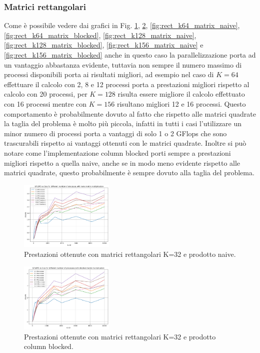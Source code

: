 \documentclass[conference]{IEEEtran}
\begin{document}
\subsubsection{Matrici rettangolari}
Come è possibile vedere dai grafici in Fig. \ref{fig:rect_k32_matrix_naive}, \ref{fig:rect_k32_matrix_blocked}, \ref{fig:rect_k64_matrix_naive}, \ref{fig:rect_k64_matrix_blocked}, \ref{fig:rect_k128_matrix_naive}, \ref{fig:rect_k128_matrix_blocked}, \ref{fig:rect_k156_matrix_naive} e \ref{fig:rect_k156_matrix_blocked} anche in questo caso la parallelizzazione porta ad un vantaggio abbastanza evidente, tuttavia non sempre il numero massimo di processi disponibili porta ai risultati migliori, ad esempio nel caso di $K=64$ effettuare il calcolo con 2, 8 e 12 processi porta a prestazioni migliori rispetto al calcolo con 20 processi, per $K=128$ risulta essere migliore il calcolo effettuato con 16 processi mentre con $K=156$ risultano migliori 12 e 16 processi. Questo comportamento è probabilmente dovuto al fatto che rispetto alle matrici quadrate la taglia del problema è molto più piccola, infatti in tutti i casi l'utilizzare un minor numero di processi porta a vantaggi di solo 1 o 2 GFlops che sono trascurabili rispetto ai vantaggi ottenuti con le matrici quadrate. Inoltre si può notare come l'implementazione column blocked porti sempre a prestazioni migliori rispetto a quella naive, anche se in modo meno evidente rispetto alle matrici quadrate, questo probabilmente è sempre dovuto alla taglia del problema.
\begin{figure}[H]
    \centering
    \includegraphics[width=0.4\textwidth]{resources/rettangolari_k32_naive.png}
    \caption{Prestazioni ottenute con matrici rettangolari K=32 e prodotto naive.}
    \label{fig:rect_k32_matrix_naive}
\end{figure}
\begin{figure}[H]
    \centering
    \includegraphics[width=0.4\textwidth]{resources/rettangolari_k32_blocked.png}
    \caption{Prestazioni ottenute con matrici rettangolari K=32 e prodotto column blocked.}
    \label{fig:rect_k32_matrix_blocked}
\end{figure}
\end{document}
